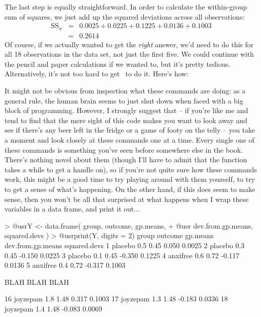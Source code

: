 \noindent
The last step is equally straightforward. In order to calculate the within-group sum of squares, we just add up  the squared deviations across all observations:
$$
\begin{array}{rcl}
\mbox{SS}_w &=& 0.0025 + 0.0225 + 0.1225 + 0.0136 + 0.1003 \\
&=& 0.2614
\end{array}
$$
\noindent
Of course, if we actually wanted to get the {\it right} answer, we'd need to do this for all 18 observations in the data set, not just the first five. We could continue with the pencil and paper calculations if we wanted to, but it's pretty tedious. Alternatively, it's not too hard to get \R\ to do it. Here's how:
It might not be obvious from inspection what these commands are doing: as a general rule, the human brain seems to just shut down when faced with a big block of programming. However, I strongly suggest that -- if you're like me and tend to find that the mere sight of this code makes you want to look away and see if there's any beer left in the fridge or a game of footy on the telly -- you take a moment and look closely at these commands one at a time. Every single one of these commands is something you've seen before somewhere else in the book. There's nothing novel about them (though I'll have to admit that the  function takes a while to get a handle on), so if you're not quite sure how these commands work, this might be a good time to try playing around with them yourself, to try to get a sense of what's happening. On the other hand, if this does seem to make sense, then you won't be all that surprised at what happens when I wrap these variables in a data frame, and print it out...
\begin{rblock1}
> @usr{Y <- data.frame( group, outcome, gp.means,}
+ @usr{                 dev.from.gp.means, squared.devs )}
> @usr{print(Y, digits = 2)}   
      group outcome gp.means dev.from.gp.means squared.devs
1   placebo     0.5     0.45             0.050       0.0025
2   placebo     0.3     0.45            -0.150       0.0225
3   placebo     0.1     0.45            -0.350       0.1225
4  anxifree     0.6     0.72            -0.117       0.0136
5  anxifree     0.4     0.72            -0.317       0.1003

BLAH BLAH BLAH
      
16 joyzepam     1.8     1.48             0.317       0.1003
17 joyzepam     1.3     1.48            -0.183       0.0336
18 joyzepam     1.4     1.48            -0.083       0.0069
\end{rblock1}
